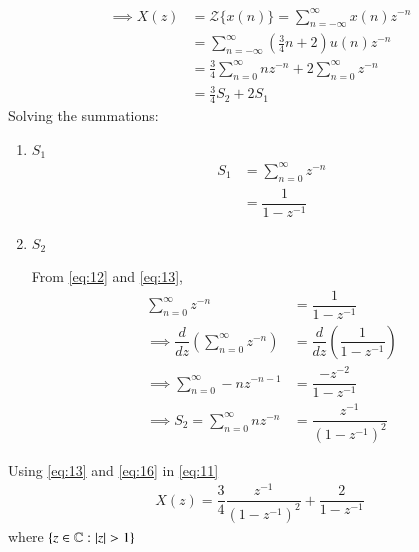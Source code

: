 \documentclass[journal,12pt,twocolumn]{IEEEtran}
\theoremstyle{remark}
\begin{document}
\begin{enumerate}
\begin{align}
        \implies X(z) &= \mathcal{Z}\{x(n)\} = \sum_{n=-\infty}^{\infty} x(n)z^{-n}\\
        &= \sum_{n=-\infty}^{\infty} \left(\frac{3}{4}n + 2\right)u(n)z^{-n}\\
        &= \frac{3}{4}\sum_{n=0}^{\infty}nz^{-n} + 2 \sum_{n=0}^{\infty}z^{-n}\\
        &= \frac{3}{4}S_2 + 2 S_1\label{eq:11}
    \end{align}
    Solving the summations:
    \begin{enumerate}
        \item $S_1$
            \begin{align}
                S_1 &= \sum_{n=0}^{\infty} z^{-n}\label{eq:12}\\
                &= \dfrac{1}{1-z^{-1}}\label{eq:13}
            \end{align}
        \item $S_2$
        
            From \eqref{eq:12} and \eqref{eq:13},
            \begin{align}
                \sum_{n=0}^{\infty} z^{-n} &= \dfrac{1}{1-z^{-1}}\\
                \implies \dfrac{d}{dz}\left(\sum_{n=0}^{\infty} z^{-n}\right) &= \dfrac{d}{dz}\left(\dfrac{1}{1-z^{-1}}\right)\\
                \implies \sum_{n=0}^{\infty} -n z^{-n-1} &= \dfrac{-z^{-2}}{1-z^{-1}}\\
                \implies S_2 = \sum_{n=0}^{\infty} n z^{-n} &= \dfrac{z^{-1}}{(1-z^{-1})^2}\label{eq:16}
            \end{align}
    \end{enumerate}
    Using \eqref{eq:13} and \eqref{eq:16} in \eqref{eq:11}
    \begin{align}
        X(z) = \dfrac{3}{4}\dfrac{z^{-1}}{(1-z^{-1})^2} + \dfrac{2}{1-z^{-1}}
    \end{align}
    where $\{z\in \mathbb{C} : \left\vert z\right\vert > 1 \}$
\end{enumerate}
\end{document}
